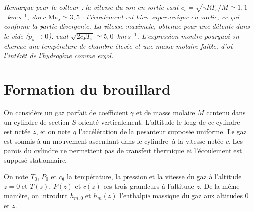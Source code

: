 \begin{correction}
\begin{enumerate}
	\textit{Remarque pour le colleur : la vitesse du son en sortie vaut $c_s=\sqrt{\gamma RT_s/M}\simeq1{,}1$~km$\cdot$s$^{-1}$, donc $\mathrm{Ma}_s\simeq3{,}5$ : l'écoulement est bien supersonique en sortie, ce qui confirme la partie divergente. La vitesse maximale, obtenue pour une détente dans le vide ($p_s\to0$), vaut $\sqrt{2c_PT_e}\simeq5{,}0$~km$\cdot$s$^{-1}$. L'expression montre pourquoi on cherche une température de chambre élevée et une masse molaire faible, d'où l'intérêt de l'hydrogène comme ergol.}

\end{enumerate}

\end{correction}

\newpage

\section{Formation du brouillard}

On considère un gaz parfait de coefficient $\gamma$ et de masse molaire $M$ contenu dans un cylindre de section $S$ orienté verticalement. L'altitude le long de ce cylindre est notée $z$, et on note $g$ l'accélération de la pesanteur supposée uniforme. Le gaz est soumis à un mouvement ascendant dans le cylindre, à la vitesse notée $c$. Les parois du cylindre ne permettent pas de transfert thermique et l'écoulement est supposé stationnaire.

On note $T_0$, $P_0$ et $c_0$ la température, la pression et la vitesse du gaz à l'altitude $z=0$ et $T(z)$, $P(z)$ et $c(z)$ ces trois grandeurs à l'altitude $z$. De la même manière, on introduit $h_{m,0}$ et $h_m(z)$ l'enthalpie massique du gaz aux altitudes $0$ et $z$.

